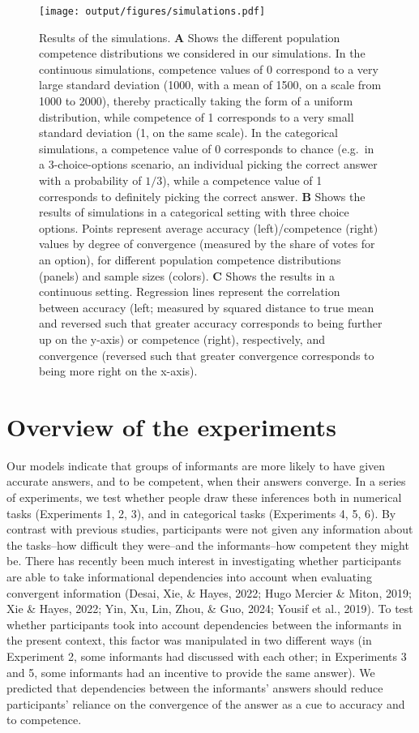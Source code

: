 \documentclass[
  doc,floatsintext]{apa6}
\begin{document}
\begin{figure}
\centering
\texttt{[image: output/figures/simulations.pdf]}
\caption{\label{fig:simulations}Results of the simulations. \textbf{A} Shows the different population competence distributions we considered in our simulations. In the continuous simulations, competence values of 0 correspond to a very large standard deviation (1000, with a mean of 1500, on a scale from 1000 to 2000), thereby practically taking the form of a uniform distribution, while competence of 1 corresponds to a very small standard deviation (1, on the same scale). In the categorical simulations, a competence value of 0 corresponds to chance (e.g.~in a 3-choice-options scenario, an individual picking the correct answer with a probability of \(1/3\)), while a competence value of 1 corresponds to definitely picking the correct answer. \textbf{B} Shows the results of simulations in a categorical setting with three choice options. Points represent average accuracy (left)/competence (right) values by degree of convergence (measured by the share of votes for an option), for different population competence distributions (panels) and sample sizes (colors). \textbf{C} Shows the results in a continuous setting. Regression lines represent the correlation between accuracy (left; measured by squared distance to true mean and reversed such that greater accuracy corresponds to being further up on the y-axis) or competence (right), respectively, and convergence (reversed such that greater convergence corresponds to being more right on the x-axis).}
\end{figure}

\section{Overview of the experiments}\label{overview-of-the-experiments}

Our models indicate that groups of informants are more likely to have given accurate answers, and to be competent, when their answers converge. In a series of experiments, we test whether people draw these inferences both in numerical tasks (Experiments 1, 2, 3), and in categorical tasks (Experiments 4, 5, 6). By contrast with previous studies, participants were not given any information about the tasks--how difficult they were--and the informants--how competent they might be. There has recently been much interest in investigating whether participants are able to take informational dependencies into account when evaluating convergent information (Desai, Xie, \& Hayes, 2022; Hugo Mercier \& Miton, 2019; Xie \& Hayes, 2022; Yin, Xu, Lin, Zhou, \& Guo, 2024; Yousif et al., 2019). To test whether participants took into account dependencies between the informants in the present context, this factor was manipulated in two different ways (in Experiment 2, some informants had discussed with each other; in Experiments 3 and 5, some informants had an incentive to provide the same answer). We predicted that dependencies between the informants' answers should reduce participants' reliance on the convergence of the answer as a cue to accuracy and to competence.
\end{document}

